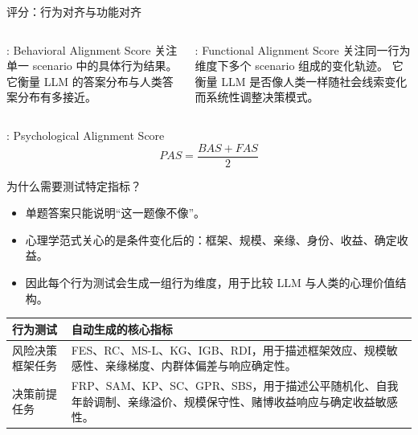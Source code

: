 \begin{frame}{评分：行为对齐与功能对齐}
  \begin{columns}[T,totalwidth=\textwidth]
    \begin{column}{0.48\textwidth}
      \begin{block}{: Behavioral Alignment Score}
        关注单一 scenario 中的具体行为结果。
        它衡量 LLM 的答案分布与人类答案分布有多接近。
      \end{block}
    \end{column}
    \begin{column}{0.48\textwidth}
      \begin{block}{: Functional Alignment Score}
        关注同一行为维度下多个 scenario 组成的变化轨迹。
        它衡量 LLM 是否像人类一样随社会线索变化而系统性调整决策模式。
      \end{block}
    \end{column}
  \end{columns}

  \vspace{0.8em}
  \begin{block}{: Psychological Alignment Score}
    \[
      PAS = \frac{BAS + FAS}{2}
    \]
  \end{block}
\end{frame}

\begin{frame}{为什么需要测试特定指标？}
  \begin{itemize}
    \item 单题答案只能说明“这一题像不像”。
    \item 心理学范式关心的是条件变化后的：框架、规模、亲缘、身份、收益、确定收益。
    \item 因此每个行为测试会生成一组行为维度，用于比较 LLM 与人类的心理价值结构。
  \end{itemize}

  \vspace{0.8em}
  \begin{tabularx}{\textwidth}{lY}
    \toprule
    行为测试 & 自动生成的核心指标 \\
    \midrule
    风险决策框架任务 &
    FES、RC、MS-L、KG、IGB、RDI，用于描述框架效应、规模敏感性、亲缘梯度、内群体偏差与响应确定性。 \\
    决策前提任务 &
    FRP、SAM、KP、SC、GPR、SBS，用于描述公平随机化、自我年龄调制、亲缘溢价、规模保守性、赌博收益响应与确定收益敏感性。 \\
    \bottomrule
  \end{tabularx}

  \vspace{0.3em}
\end{frame}
